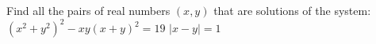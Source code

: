 Find all the pairs of real numbers $(x,y)$ that are solutions of the system:
$(x^{2}+y^{2})^{2}-xy(x+y)^{2}=19 $
$| x - y | = 1$